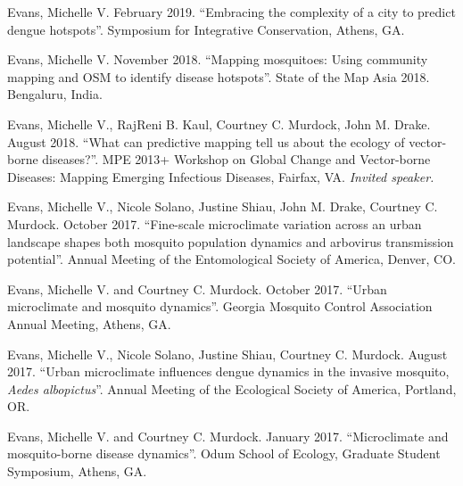 
\begin{cvitems}
	\bigskip
	\item Evans, Michelle V. February 2019. ``Embracing the complexity of a city to predict dengue hotspots''. Symposium for Integrative Conservation, Athens, GA.

	\item Evans, Michelle V. November 2018. ``Mapping mosquitoes: Using community mapping and OSM to identify disease hotspots''. State of the Map Asia 2018. Bengaluru, India.

	\item Evans, Michelle V., RajReni B. Kaul, Courtney C. Murdock, John M. Drake. August 2018. ``What can predictive mapping tell us about the ecology of vector-borne diseases?''. MPE 2013+ Workshop on Global Change and Vector-borne Diseases: Mapping Emerging Infectious Diseases, Fairfax, VA. \textit{Invited speaker.}

	\item Evans, Michelle V., Nicole Solano, Justine Shiau, John M. Drake, Courtney C. Murdock. October 2017. ``Fine-scale microclimate variation across an urban landscape shapes both mosquito population dynamics and arbovirus transmission potential''. Annual Meeting of the Entomological Society of America, Denver, CO.

	\item Evans, Michelle V. and Courtney C. Murdock. October 2017. ``Urban microclimate and mosquito dynamics''. Georgia Mosquito Control Association Annual Meeting, Athens, GA.

	\item Evans, Michelle V., Nicole Solano, Justine Shiau, Courtney C. Murdock. August 2017. ``Urban microclimate influences dengue dynamics in the invasive mosquito, \textit{Aedes albopictus}''. Annual Meeting of the Ecological Society of America, Portland, OR.

	\item Evans, Michelle V. and Courtney C. Murdock. January 2017. ``Microclimate and mosquito-borne disease dynamics''. Odum School of Ecology, Graduate Student Symposium, Athens, GA.


\end{cvitems}
